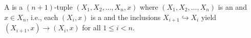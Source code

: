 \begin{definition} \label{definition:pointed_n_tuple_of_topological_spaces}
    A  is a $(n+1)$-tuple $(X_1, X_2, \dots, X_n, x)$ where $(X_1, X_2, \dots, X_n)$ is an  and $x \in X_n$, i.e., each $(X_i, x)$ is a  and the inclusions $X_{i+1} \hookrightarrow X_i$ yield  $(X_{i+1}, x) \to (X_i, x)$ for all $1 \le i < n$.
\end{definition}